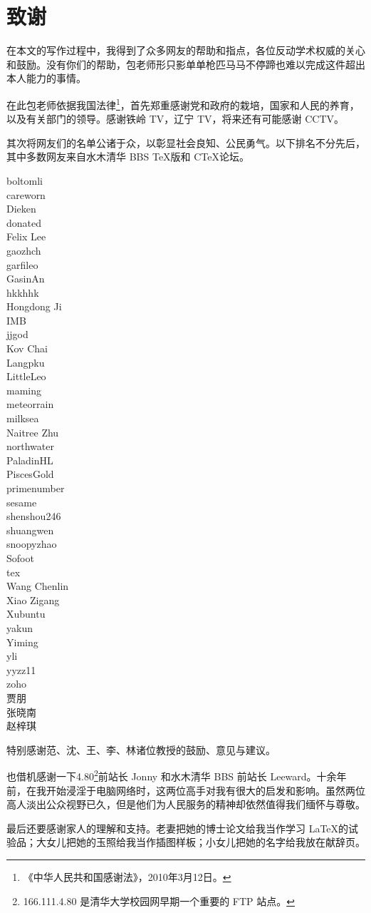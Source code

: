 \chapter{致谢}

在本文的写作过程中，我得到了众多网友的帮助和指点，各位反动学术权威的关心和鼓励。没有你们的帮助，包老师形只影单单枪匹马马不停蹄也难以完成这件超出本人能力的事情。

在此包老师依据我国法律\footnote{《中华人民共和国感谢法》，2010年3月12日。}，首先郑重感谢党和政府的栽培，国家和人民的养育，以及有关部门的领导。感谢铁岭 TV，辽宁 TV，将来还有可能感谢 CCTV。

其次将网友们的名单公诸于众，以彰显社会良知、公民勇气。以下排名不分先后，其中多数网友来自水木清华 BBS \TeX 版和 C\TeX 论坛。

\begin{multicols}{3}
\noindent
boltomli\\
careworn\\
Dieken\\
donated\\
Felix Lee\\
gaozhch\\
garfileo\\
GasinAn\\
hkkhhk\\
Hongdong Ji\\
IMB\\
jjgod\\
Kov Chai\\
Langpku\\
LittleLeo\\
maming\\
meteorrain\\
milksea\\
Naitree Zhu\\
northwater\\
PaladinHL\\
PiscesGold\\
primenumber\\
sesame\\
shenshou246\\
shuangwen\\
snoopyzhao\\
Sofoot\\
tex\\
Wang Chenlin\\
Xiao Zigang\\
Xubuntu\\
yakun\\
Yiming\\
yli\\
yyzz11\\
zoho\\
贾朋\\
张晓南\\
赵梓琪
\end{multicols}

特别感谢范、沈、王、李、林诸位教授的鼓励、意见与建议。

也借机感谢一下4.80\footnote{166.111.4.80 是清华大学校园网早期一个重要的 FTP 站点。}前站长 Jonny 和水木清华 BBS 前站长 Leeward。十余年前，在我开始浸淫于电脑网络时，这两位高手对我有很大的启发和影响。虽然两位高人淡出公众视野已久，但是他们为人民服务的精神却依然值得我们缅怀与尊敬。

最后还要感谢家人的理解和支持。老妻把她的博士论文给我当作学习 \LaTeX 的试验品；大女儿把她的玉照给我当作插图样板；小女儿把她的名字给我放在献辞页。

